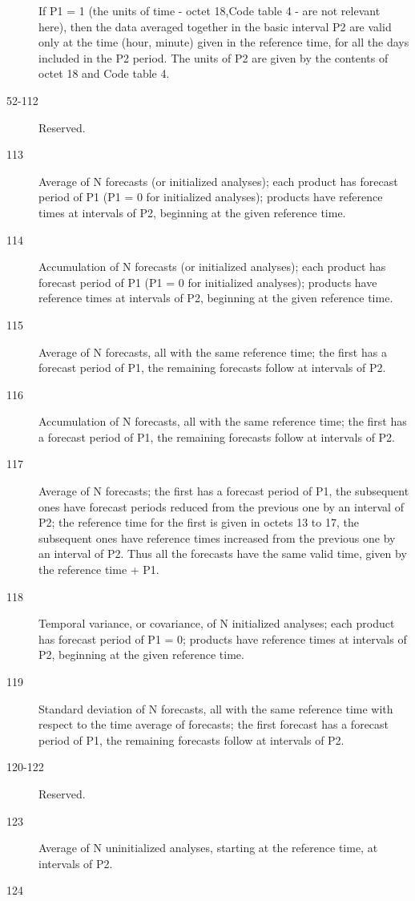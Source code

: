 \documentclass[final,12pt,a4paper,twoside]{book}
\begin{document}
\begin{description}
  If P1 = 1 (the units of time - octet 18,Code table 4 - are not relevant
  here), then the data averaged together in the basic interval P2 are valid
  only at the time (hour, minute) given in the reference time, for all the days
  included in the P2 period. The units of P2  are given by the contents of
  octet 18 and Code table 4.
\item [52-112] Reserved.
\item [113]
  Average of N forecasts (or initialized analyses); each product has forecast
  period of P1 (P1 = 0 for initialized analyses); products have reference
  times at intervals of P2, beginning at the given reference time.
\item [114]
  Accumulation of N forecasts (or initialized analyses); each product has
  forecast period of P1 (P1 = 0 for initialized analyses); products have
  reference times at intervals of P2, beginning at the given reference time.
\item [115]
  Average of N forecasts, all with the same reference time; the first has a
  forecast period of P1, the remaining forecasts follow at intervals of P2.
\item [116]
  Accumulation of N forecasts, all with the same reference time; the first has
  a forecast period of P1, the remaining forecasts follow at intervals of P2.
\item [117]
  Average of N forecasts; the first has a forecast period of P1, the
  subsequent ones have forecast periods reduced from the previous one by an
  interval of P2; the reference time for the first is given in octets 13 to 17,
  the subsequent ones have reference times increased from the previous one by
  an interval of P2. Thus all the forecasts have the same valid time, given by
  the reference time + P1.
\item [118]
  Temporal variance, or covariance, of N initialized analyses; each product has
  forecast period of P1  = 0; products have reference times at intervals of P2,
  beginning at the given reference time.
\item [119]
  Standard deviation of N forecasts, all with the same reference time with
  respect to the time average of forecasts; the first forecast has a forecast
  period of P1, the remaining forecasts follow at intervals of P2.
\item [120-122] Reserved.
\item [123]
  Average of N uninitialized analyses, starting at the reference time, at
  intervals of P2.
\item [124]

\end{description}
\end{document}
